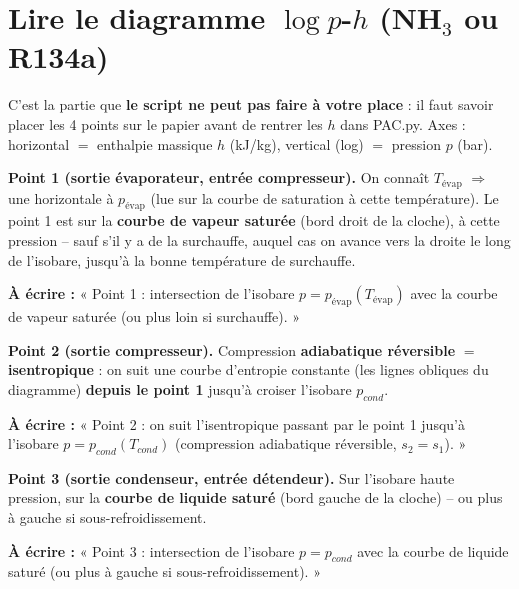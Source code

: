 \documentclass[11pt,a4paper]{article}
\begin{document}
\newpage
\section{Lire le diagramme $\log p$-$h$ (NH$_3$ ou R134a)}

\begin{info}
C'est la partie que \textbf{le script ne peut pas faire à votre place} : il faut savoir placer les 4
points sur le papier avant de rentrer les $h$ dans PAC.py. Axes : horizontal $=$ enthalpie massique
$h$ (kJ/kg), vertical (log) $=$ pression $p$ (bar).
\end{info}

\begin{step}
\textbf{Point 1 (sortie évaporateur, entrée compresseur).} On connaît $T_{\text{évap}}$
$\Rightarrow$ une horizontale à $p_{\text{évap}}$ (lue sur la courbe de saturation à cette température).
Le point 1 est sur la \textbf{courbe de vapeur saturée} (bord droit de la cloche), à cette pression --
sauf s'il y a de la surchauffe, auquel cas on avance vers la droite le long de l'isobare, jusqu'à
la bonne température de surchauffe.
\end{step}
\begin{ecrire}
\textbf{À écrire :} « Point 1 : intersection de l'isobare $p=p_{\text{évap}}(T_{\text{évap}})$ avec la courbe de
vapeur saturée (ou plus loin si surchauffe). »
\end{ecrire}

\begin{step}
\textbf{Point 2 (sortie compresseur).} Compression \textbf{adiabatique réversible} $=$
\textbf{isentropique} : on suit une courbe d'entropie constante (les lignes obliques du diagramme)
\textbf{depuis le point 1} jusqu'à croiser l'isobare $p_{cond}$.
\end{step}
\begin{ecrire}
\textbf{À écrire :} « Point 2 : on suit l'isentropique passant par le point 1 jusqu'à l'isobare
$p=p_{cond}(T_{cond})$ (compression adiabatique réversible, $s_2=s_1$). »
\end{ecrire}

\begin{step}
\textbf{Point 3 (sortie condenseur, entrée détendeur).} Sur l'isobare haute pression, sur la
\textbf{courbe de liquide saturé} (bord gauche de la cloche) -- ou plus à gauche si sous-refroidissement.
\end{step}
\begin{ecrire}
\textbf{À écrire :} « Point 3 : intersection de l'isobare $p=p_{cond}$ avec la courbe de liquide
saturé (ou plus à gauche si sous-refroidissement). »
\end{ecrire}
\end{document}

